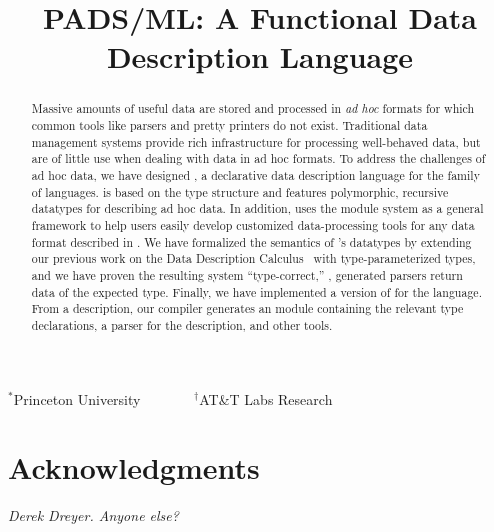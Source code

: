 \documentclass[nocopyrightspace]{sigplanconf}
\begin{document}
\title{PADS/ML: A Functional Data Description Language}
{$^\ast$Princeton University \ \ \ \ \ \ \ $^\dagger$AT\&T Labs Research}
 { \ \ \ \ }



\maketitle{}

\begin{abstract}  

  Massive amounts of useful data are stored and processed in
  \textit{ad hoc} formats for which common tools like parsers and
  pretty printers do not exist.  Traditional data management 
  systems provide rich infrastructure for processing well-behaved
  data, but are of little use when dealing with data in ad hoc
  formats.  To address the challenges of ad hoc data, we have designed
  \padsml{}, a declarative data description language for the \ml{} family
  of languages.  \padsml{} is based on the \ml{} type structure and
  features polymorphic, recursive datatypes for describing ad hoc
  data.  In addition, \padsml{} uses the \ml{} module system as a general
  framework to help users easily develop customized data-processing
  tools for any data format described in \padsml{}.  We have formalized the
  semantics of \padsml{}'s datatypes by extending our previous work on
  the Data Description Calculus~\cite{fisher+:next700ddl} with
  type-parameterized types, and we have proven the resulting system
  ``type-correct,'' \ie{}, generated parsers return data of the
  expected type.  Finally, we have implemented a version of \padsml{}
  for the \ocaml{} language.  From a \padsml{} description, our compiler
  generates an \ocaml{} module containing the relevant type
  declarations, a parser for the description, and other tools.

\end{abstract}















\section*{Acknowledgments}

\emph{Derek Dreyer. Anyone else?}



%


\end{document}
